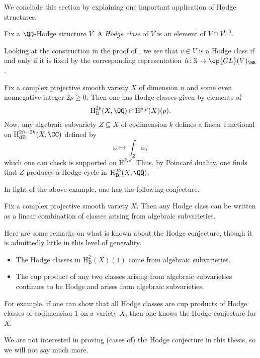 \documentclass[../thesis.tex]{subfiles}
\begin{document}
We conclude this section by explaining one important application of Hodge structures.
\begin{definition}
	Fix a $\QQ$-Hodge structure $V$. A \textit{Hodge class} of $V$ is an element of $V\cap V^{0,0}$.
\end{definition}
\begin{remark} \label{rem:hodge-class-by-s}
	Looking at the construction in the proof of , we see that $v\in V$ is a Hodge class if and only if it is fixed by the corresponding representation $h\colon\mathbb S\to\op{GL}(V)_\RR$.
\end{remark}
\begin{example}
	Fix a complex projective smooth variety $X$ of dimension $n$ and some even nonnegative integer $2p\ge0$. Then one has Hodge classes given by elements of
	\[\mathrm H^{2p}_{\mathrm B}(X,\QQ)\cap\mathrm H^{p,p}(X)(p).\]
	Now, any algebraic subvariety $Z\subseteq X$ of codimension $k$ defines a linear functional on $\mathrm H^{2n-2k}_{\mathrm{dR}}(X,\CC)$ defined by
	\[\omega\mapsto\int_Z\omega,\]
	which one can check is supported on $\mathrm H^{k,k}$. Thus, by Poincar\'e duality, one finds that $Z$ produces a Hodge cycle in $\mathrm H^{2k}_{\mathrm B}(X,\QQ)$.
\end{example}
In light of the above example, one has the following conjecture.
\begin{conj}[Hodge] \label{conj:hodge}
	Fix a complex projective smooth variety $X$. Then any Hodge class can be written as a linear combination of classes arising from algebraic subvarieties.
\end{conj}
\begin{remark}
	Here are some remarks on what is known about the Hodge conjecture, though it is admittedly little in this level of generality.
	\begin{itemize}
		\item The Hodge classes in $\mathrm H_{\mathrm B}^2(X)(1)$ come from algebraic subvarieties.
		\item The cup product of any two classes arising from algebraic subvarieties continues to be Hodge and arises from algebraic subvarieties.
	\end{itemize}
	For example, if one can show that all Hodge classes are cup products of Hodge classes of codimension $1$ on a variety $X$, then one knows the Hodge conjecture for $X$.
\end{remark}
We are not interested in proving (cases of) the Hodge conjecture in this thesis, so we will not say much more.
\end{document}
